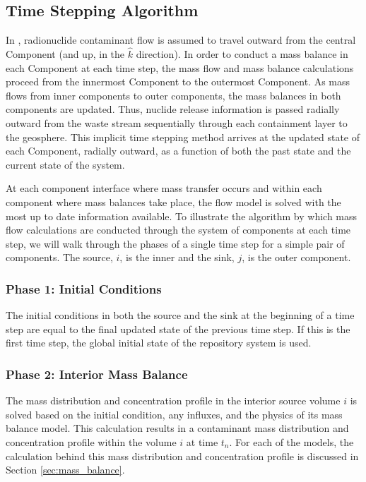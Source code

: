 \subsection{Time Stepping Algorithm}\label{sec:time stepping}

In \Cyder, radionuclide contaminant flow is assumed to travel outward from 
the central Component (and up, in the $\hat{k}$ direction). In order to conduct 
a mass balance in each Component at each time step, the mass flow and mass 
balance calculations proceed from the innermost Component to the outermost 
Component. As mass flows from inner components to outer components, the mass 
balances in both components are updated.  Thus, nuclide release information is 
passed radially outward from the waste stream sequentially through each 
containment layer to the geosphere.  This implicit time stepping method 
arrives at the updated state of each Component, radially outward, as a function 
of both the past state and the current state of the system. 

At each component interface where mass transfer occurs and within each component 
where mass balances take place, the flow model is solved with the most up to 
date information available.  To illustrate the algorithm by which mass flow 
calculations are conducted through the system of components at each time step, we 
will walk through the phases of a single time step for a simple pair of 
components. The source, $i$, is the inner and the sink, $j$, is the outer
component. 

\subsubsection{Phase 1: Initial Conditions}

The initial conditions in both the source and the sink at the beginning of a 
time step are equal to the final updated state of the previous time step. If this 
is the first time step, the global initial state of the repository system is used. 

\subsubsection{Phase 2: Interior Mass Balance}

The mass distribution and concentration profile in the interior source volume 
$i$ is solved based on the initial condition, any influxes, and the physics of 
its mass balance model.  This calculation results in a contaminant mass 
distribution and concentration profile within the volume $i$ at time $t_n$.  
For each of the models, the calculation behind this mass distribution and 
concentration profile is discussed in Section \ref{sec:mass_balance}.

